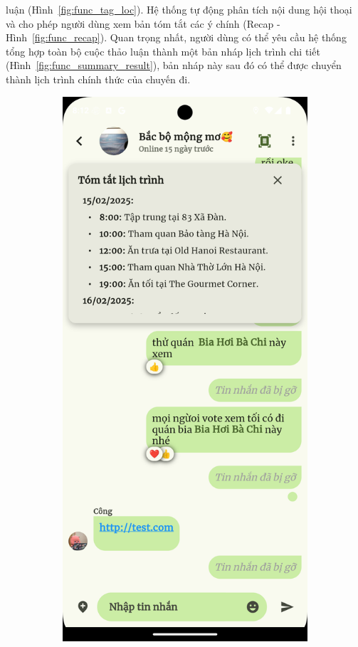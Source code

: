 luận (Hình~\ref{fig:func_tag_loc}). Hệ thống tự động phân tích nội dung hội thoại và cho phép người dùng xem bản tóm tắt các ý chính (Recap - Hình~\ref{fig:func_recap}). Quan trọng nhất, người dùng có thể yêu cầu hệ thống tổng hợp toàn bộ cuộc thảo luận thành một bản nháp lịch trình chi tiết (Hình~\ref{fig:func_summary_result}), bản nháp này sau đó có thể được chuyển thành lịch trình chính thức của chuyến đi.

\begin{figure}[H]
    \centering
    \begin{subfigure}{0.326\textwidth}
        \includegraphics[width=1\linewidth]{figures/c4/system_func/recap.png}

\end{subfigure}
\end{figure}
